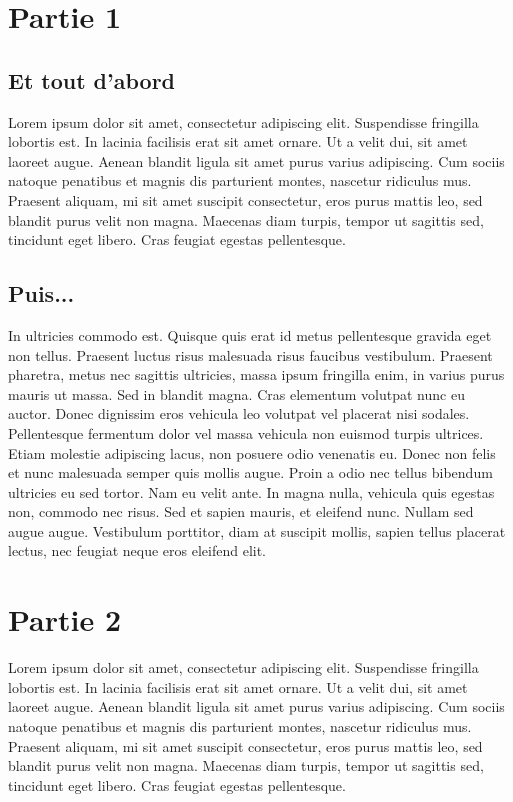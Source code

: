 \documentclass[a4paper,12pt]{report}
\begin{document}
\chapter{Partie 1}
\section{Et tout d'abord}
Lorem ipsum dolor sit amet, consectetur adipiscing elit. Suspendisse
fringilla lobortis est. In lacinia facilisis erat sit amet ornare. Ut
a velit dui, sit amet laoreet augue. Aenean blandit ligula sit amet
purus varius adipiscing. Cum sociis natoque penatibus et magnis dis
parturient montes, nascetur ridiculus mus. Praesent aliquam, mi sit
amet suscipit consectetur, eros purus mattis leo, sed blandit purus
velit non magna. Maecenas diam turpis, tempor ut sagittis sed,
tincidunt eget libero. Cras feugiat egestas pellentesque.

\section{Puis...}
In ultricies commodo est. Quisque quis erat id metus pellentesque
gravida eget non tellus. Praesent luctus risus malesuada risus
faucibus vestibulum. Praesent pharetra, metus nec sagittis ultricies,
massa ipsum fringilla enim, in varius purus mauris ut massa. Sed in
blandit magna. Cras elementum volutpat nunc eu auctor. Donec dignissim
eros vehicula leo volutpat vel placerat nisi sodales. Pellentesque
fermentum dolor vel massa vehicula non euismod turpis ultrices. Etiam
molestie adipiscing lacus, non posuere odio venenatis eu. Donec non
felis et nunc malesuada semper quis mollis augue. Proin a odio nec
tellus bibendum ultricies eu sed tortor. Nam eu velit ante. In magna
nulla, vehicula quis egestas non, commodo nec risus. Sed et sapien
mauris, et eleifend nunc. Nullam sed augue augue. Vestibulum
porttitor, diam at suscipit mollis, sapien tellus placerat lectus, nec
feugiat neque eros eleifend elit.

\chapter{Partie 2}
Lorem ipsum dolor sit amet, consectetur adipiscing elit. Suspendisse
fringilla lobortis est. In lacinia facilisis erat sit amet ornare. Ut
a velit dui, sit amet laoreet augue. Aenean blandit ligula sit amet
purus varius adipiscing. Cum sociis natoque penatibus et magnis dis
parturient montes, nascetur ridiculus mus. Praesent aliquam, mi sit
amet suscipit consectetur, eros purus mattis leo, sed blandit purus
velit non magna. Maecenas diam turpis, tempor ut sagittis sed,
tincidunt eget libero. Cras feugiat egestas pellentesque.
\end{document}
